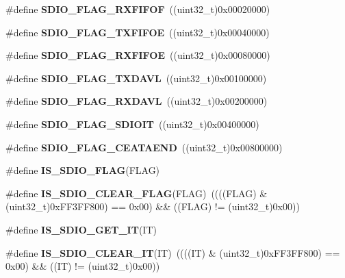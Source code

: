 \begin{DoxyCompactItemize}
\item 
\hypertarget{group__SDIO__Flags_gaf92cb783f000b8d946fe8ace81b51df2}{
\#define {\bfseries SDIO\_\-FLAG\_\-RXFIFOF}~((uint32\_\-t)0x00020000)}
\label{group__SDIO__Flags_gaf92cb783f000b8d946fe8ace81b51df2}

\item 
\hypertarget{group__SDIO__Flags_gac41ef05773abad79b4b0c443a77733db}{
\#define {\bfseries SDIO\_\-FLAG\_\-TXFIFOE}~((uint32\_\-t)0x00040000)}
\label{group__SDIO__Flags_gac41ef05773abad79b4b0c443a77733db}

\item 
\hypertarget{group__SDIO__Flags_ga59ea7e2dc22df742053c5e525b98599d}{
\#define {\bfseries SDIO\_\-FLAG\_\-RXFIFOE}~((uint32\_\-t)0x00080000)}
\label{group__SDIO__Flags_ga59ea7e2dc22df742053c5e525b98599d}

\item 
\hypertarget{group__SDIO__Flags_ga9c6620d6b16b6af19d3e14f40e688631}{
\#define {\bfseries SDIO\_\-FLAG\_\-TXDAVL}~((uint32\_\-t)0x00100000)}
\label{group__SDIO__Flags_ga9c6620d6b16b6af19d3e14f40e688631}

\item 
\hypertarget{group__SDIO__Flags_ga7558b354658171bb6aa1b6f1e16d8e21}{
\#define {\bfseries SDIO\_\-FLAG\_\-RXDAVL}~((uint32\_\-t)0x00200000)}
\label{group__SDIO__Flags_ga7558b354658171bb6aa1b6f1e16d8e21}

\item 
\hypertarget{group__SDIO__Flags_gae888ec1c9885c35a5f8e01bcffe324a1}{
\#define {\bfseries SDIO\_\-FLAG\_\-SDIOIT}~((uint32\_\-t)0x00400000)}
\label{group__SDIO__Flags_gae888ec1c9885c35a5f8e01bcffe324a1}

\item 
\hypertarget{group__SDIO__Flags_ga3c8d09a405944948e7a1c5493d49aff1}{
\#define {\bfseries SDIO\_\-FLAG\_\-CEATAEND}~((uint32\_\-t)0x00800000)}
\label{group__SDIO__Flags_ga3c8d09a405944948e7a1c5493d49aff1}

\item 
\#define {\bfseries IS\_\-SDIO\_\-FLAG}(FLAG)
\item 
\hypertarget{group__SDIO__Flags_ga8a093bc0b51901676fd5da7087d8ab3a}{
\#define {\bfseries IS\_\-SDIO\_\-CLEAR\_\-FLAG}(FLAG)~((((FLAG) \& (uint32\_\-t)0xFF3FF800) == 0x00) \&\& ((FLAG) != (uint32\_\-t)0x00))}
\label{group__SDIO__Flags_ga8a093bc0b51901676fd5da7087d8ab3a}

\item 
\#define {\bfseries IS\_\-SDIO\_\-GET\_\-IT}(IT)
\item 
\hypertarget{group__SDIO__Flags_gaf829b01d8c3e9a1e4e04d39abdc8c355}{
\#define {\bfseries IS\_\-SDIO\_\-CLEAR\_\-IT}(IT)~((((IT) \& (uint32\_\-t)0xFF3FF800) == 0x00) \&\& ((IT) != (uint32\_\-t)0x00))}
\label{group__SDIO__Flags_gaf829b01d8c3e9a1e4e04d39abdc8c355}

\end{DoxyCompactItemize}


